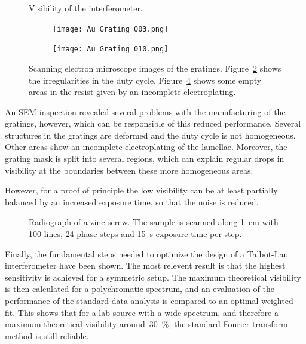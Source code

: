 \documentclass[a4paper]{spie}
\begin{document}
\begin{figure}[htb]
    \centering
    
    \caption[Visibility.]{Visibility of the interferometer.}
    \label{fig:visibility}
\end{figure}

\begin{figure}[htb]
    \centering
    \begin{subfigure}[b]{.49\textwidth}
    \centering
    \texttt{[image: Au\_Grating\_003.png]}
    \caption{}
    \label{fig:deformations}
    \end{subfigure}
    \hfill
    \begin{subfigure}[b]{.49\textwidth}
    \centering
    \texttt{[image: Au\_Grating\_010.png]}
    \caption{}
    \label{fig:electroplating}
    \end{subfigure}
    \caption[SEM images of the gratings.]{Scanning electron microscope
        images of the gratings. Figure~\ref{fig:deformations} shows the
        irregularities in the duty cycle. Figure~\ref{fig:electroplating}
    shows some empty areas in the resist given by an incomplete
electroplating.}
\end{figure}

An SEM inspection revealed several problems with the manufacturing of the
gratings, however, which can be responsible of this reduced performance.
Several structures in the gratings are deformed and the duty cycle is not
homogeneous. Other areas show an incomplete electroplating of the lamellae.
Moreover, the grating mask is 
split into several regions, which can explain regular drops in visibility at
the boundaries between these more homogeneous areas.

However, for a proof of principle the low visibility can be at least
partially balanced by an
increased exposure time, so that the noise is reduced.

\begin{figure}[hbt]
    \centering
    
    \caption[Radiograph of a zinc screw.]{Radiograph of a zinc screw.
        The sample is scanned along \SI{1}{\centi\metre} with \num{100}
        lines, \num{24} phase steps and \SI{15}{\second} exposure time per
    step.}
    \label{fig:screw}
\end{figure}

Finally, the fundamental steps needed to optimize the design of a Talbot-Lau
interferometer have been shown. The most relevent result is that the highest
sensitivity is achieved for a symmetric setup. The maximum theoretical
visibility is then calculated for a polychromatic spectrum, and an
evaluation of the performance of the standard data analysis is compared to an
optimal weighted fit. This shows that for a lab source with a wide spectrum,
and therefore a maximum theoretical visibility around~\SI{30}{\percent}, the
standard Fourier transform method is still reliable.
\end{document}

